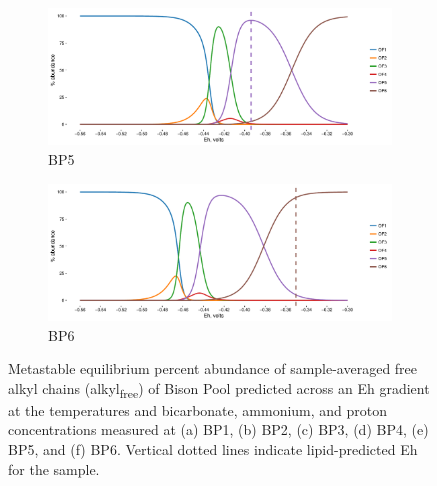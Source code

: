 {\begin{figure}[h]
    \begin{subfigure}[b]{\linewidth}
    	\includegraphics[width=\linewidth]{"figs_ch2/Bison OF5_thermo"}
    	\caption{BP5}
        \label{fig:BP5_thermo}
    \end{subfigure}
    \begin{subfigure}[b]{\linewidth}
    	\includegraphics[width=\linewidth]{"figs_ch2/Bison OF6_thermo"}
    	\caption{BP6}
        \label{fig:BP6_thermo}
    \end{subfigure}
    
    \caption[Predicted metastable equilibrium abundance of sample-averaged free alkyl chains of Bison Pool samples]{Metastable equilibrium percent abundance of sample-averaged free alkyl chains (alkyl\textsubscript{free}) of Bison Pool predicted across an Eh gradient at the temperatures and bicarbonate, ammonium, and proton concentrations measured at (a) BP1, (b) BP2, (c) BP3, (d) BP4, (e) BP5, and (f) BP6. Vertical dotted lines indicate lipid-predicted Eh for the sample.}
    \label{fig:bison_thermo}
\end{figure}
\doublespace
\clearpage
}


